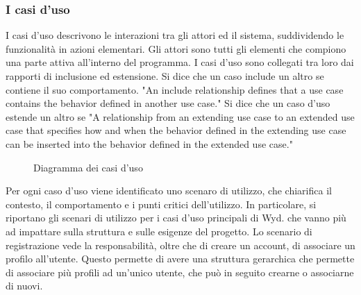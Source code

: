 \clearpage


\subsubsection{I casi d’uso}

I casi d’uso descrivono le interazioni tra gli attori ed il sistema, suddividendo le funzionalità in azioni elementari.
Gli attori sono tutti gli elementi che compiono una parte attiva all'interno del programma.
I casi d'uso sono collegati tra loro dai rapporti di inclusione ed estensione.
Si dice che un caso include un altro se contiene il suo comportamento.
"An include relationship defines that a use case contains the behavior defined in another use case."
Si dice che un caso d'uso estende un altro se 
"A relationship from an extending use case to an extended use case that specifies how and when the behavior defined in
the extending use case can be inserted into the behavior defined in the extended use case."

\begin{figure}[h!]
    \centering
    \caption{Diagramma dei casi d'uso}
\end{figure}

Per ogni caso d'uso viene identificato uno scenaro di utilizzo, che chiarifica il contesto, il comportamento e i punti critici dell'utilizzo.
In particolare, si riportano gli scenari di utilizzo per i casi d'uso principali di Wyd.
che vanno più ad impattare sulla struttura e sulle esigenze del progetto.
\clearpage
Lo scenario di registrazione vede la responsabilità, oltre che di creare un account, di associare un profilo all'utente.
Questo permette di avere una struttura gerarchica che permette di associare più profili ad un'unico utente, che può in seguito crearne o associarne di nuovi.\\

